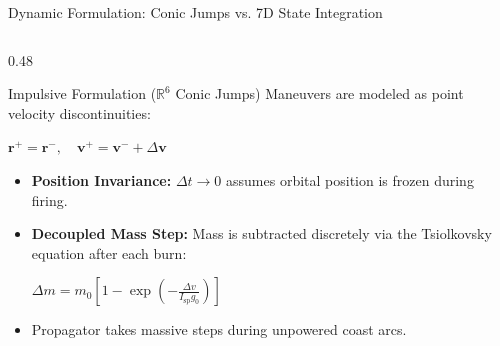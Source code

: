\documentclass[aspectratio=169, 10pt]{beamer}
\begin{document}
\begin{frame}{Dynamic Formulation: Conic Jumps vs. 7D State Integration}
    \begin{columns}[T]
        \begin{column}{0.48\textwidth}
            \begin{block}{Impulsive Formulation ($\mathbb{R}^6$ Conic Jumps)}
                \scriptsize
                Maneuvers are modeled as point velocity discontinuities:
                \par\vspace{1pt}
                {\centering $\mathbf{r}^+ = \mathbf{r}^-, \quad \mathbf{v}^+ = \mathbf{v}^- + \Delta \mathbf{v}$ \par}
                \begin{itemize}\setlength{\itemsep}{1.2pt}\setlength{\topsep}{0pt}
                    \item \textbf{Position Invariance:} $\Delta t \to 0$ assumes orbital position is frozen during firing.
                    \item \textbf{Decoupled Mass Step:} Mass is subtracted discretely via the Tsiolkovsky equation after each burn:
                    \par\vspace{1pt}
                    {\centering $\Delta m = m_0 \left[1 - \exp\left(-\frac{\Delta v}{I_{\text{sp}} g_0}\right)\right]$ \par}
                    \item Propagator takes massive steps during unpowered coast arcs.
                \end{itemize}
            \end{block}
        \end{column}


\end{columns}
\end{frame}
\end{document}
